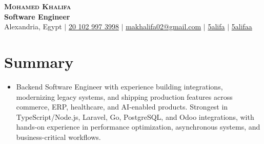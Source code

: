 \documentclass[letterpaper,11pt]{article}
\newcommand{\resumeSubHeadingListStart}{\begin{itemize}[leftmargin=0.15in, label={}]}
\newcommand{\resumeSubHeadingListEnd}{\end{itemize}}
\begin{document}
\begin{center}
    \textbf{\Huge \scshape Mohamed Khalifa} \\ \vspace{1pt}
    \textbf{Software Engineer} \\  \vspace{3pt}
    \faMapMarker* Alexandria, Egypt $|$
    \href{tel:201029973998}{{\small {\footnotesize \faPhone*}\hspace*{0.13cm}20 102 997 3998}} $|$ 
    \href{mailto:makhalifa02@gmail.com}{\faEnvelope[regular]\hspace*{0.13cm}makhalifa02@gmail.com} $|$ 
    \href{https://www.linkedin.com/in/5alifa}{\faLinkedinIn \hspace*{0.13cm}5alifa} $|$
    \href{https://github.com/5alifaa}{\faGithub\hspace*{0.13cm}5alifaa}
\end{center}

\section{Summary}
\resumeSubHeadingListStart
\item \small
Backend Software Engineer with experience building integrations, modernizing legacy systems, and shipping production features across commerce, ERP, healthcare, and AI-enabled products. Strongest in TypeScript/Node.js, Laravel, Go, PostgreSQL, and Odoo integrations, with hands-on experience in performance optimization, asynchronous systems, and business-critical workflows.
\resumeSubHeadingListEnd


\end{document}
